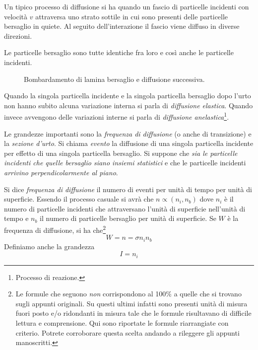 Un tipico processo di diffusione si ha quando un fascio di particelle incidenti
con velocità $v$ attraversa uno strato sottile in cui sono presenti delle
particelle bersaglio in quiete. Al seguito dell'interazione il fascio viene
diffuso in diverse direzioni.

Le particelle bersaglio sono tutte identiche fra loro e così anche le 
particelle incidenti.
\begin{figure}
  \caption{Bombardamento di lamina bersaglio e diffusione successiva.}
  \label{fig:diffusione}
  
\end{figure}
Quando la singola particella incidente e la singola particella bersaglio dopo 
l'urto non hanno subito alcuna variazione interna si parla di 
\textit{diffusione elastica}. Quando invece avvengono delle variazioni interne 
si parla di \textit{diffusione anelastica}\footnote{Processo di reazione. }.

Le grandezze importanti sono la \textit{frequenza di diffusione} (o anche di 
transizione) e la \textit{sezione d'urto}. Si chiama \textit{evento} la 
diffusione di una singola particella incidente per effetto di una singola 
particella bersaglio. Si suppone che \textit{sia le particelle incidenti che 
quelle bersaglio siano insiemi statistici} e che le particelle incidenti 
\textit{arrivino perpendicolarmente al piano}.

Si dice \textit{frequenza di diffusione} il 
numero di eventi per unità di tempo per unità di superficie. Essendo il 
processo casuale si avrà che $n\propto (n_i, n_b)$ dove $n_i$ è il numero di 
particelle incidenti che attraversano l'unità di superficie nell'unità di 
tempo e $n_b$ il numero di particelle bersaglio per unità di superficie. Se 
$W$ è la frequenza di diffusione, si ha che\footnote{Le formule che seguono 
\textit{non} corrispondono al 100\% a quelle che si trovano sugli appunti 
originali. Su questi ultimi infatti sono presenti unità di misura fuori posto 
e/o ridondanti in misura tale che le formule risultavano di difficile lettura e 
comprensione. Qui sono riportate le formule riarrangiate con criterio. Potrete 
corroborare questa scelta andando a rileggere gli appunti manoscritti.}
\begin{equation}
 W = n = \sigma n_in_b
\end{equation}
Definiamo anche la grandezza
\begin{equation}
 I = n_i
\end{equation}

